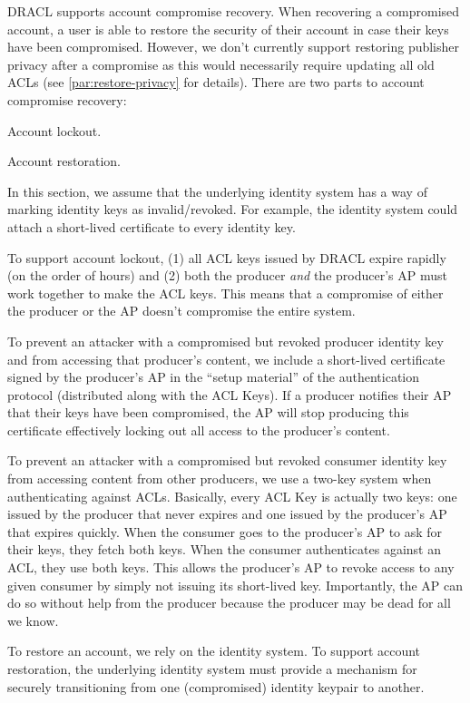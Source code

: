 \documentclass[pdftex,12pt,a4papaer,twoside,notitlepage]{report}
\begin{document}
DRACL supports account compromise recovery. When recovering a compromised
account, a user is able to restore the security of their account in case their
keys have been compromised. However, we don't currently support restoring
publisher privacy after a compromise as this would necessarily require updating
all old ACLs (see \cref{par:restore-privacy} for details). There are two parts
to account compromise recovery:

\begin{compactenum}
\item Account lockout.
\item Account restoration.
\end{compactenum}

In this section, we assume that the underlying identity system has a way of
marking identity keys as invalid/revoked. For example, the identity system could
attach a short-lived certificate to every identity key.

To support account lockout, (1) all ACL keys issued by DRACL expire rapidly (on
the order of hours) and (2) both the producer \emph{and} the producer's AP must
work together to make the ACL keys. This means that a compromise of either the
producer or the AP doesn't compromise the entire system.

To prevent an attacker with a compromised but revoked producer identity key and
from accessing that producer's content, we include a short-lived certificate
signed by the producer's AP in the ``setup material'' of the authentication
protocol (distributed along with the ACL Keys). If a producer notifies their AP
that their keys have been compromised, the AP will stop producing this
certificate effectively locking out all access to the producer's content.

To prevent an attacker with a compromised but revoked consumer identity key from
accessing content from other producers, we use a two-key system when
authenticating against ACLs. Basically, every ACL Key is actually two keys: one
issued by the producer that never expires and one issued by the producer's AP
that expires quickly. When the consumer goes to the producer's AP to ask for
their keys, they fetch both keys. When the consumer authenticates against an
ACL, they use both keys. This allows the producer's AP to revoke access to any
given consumer by simply not issuing its short-lived key. Importantly, the AP
can do so without help from the producer because the producer may be dead for
all we know.

To restore an account, we rely on the identity system. To support account
restoration, the underlying identity system must provide a mechanism for
securely transitioning from one (compromised) identity keypair to another.
\end{document}
